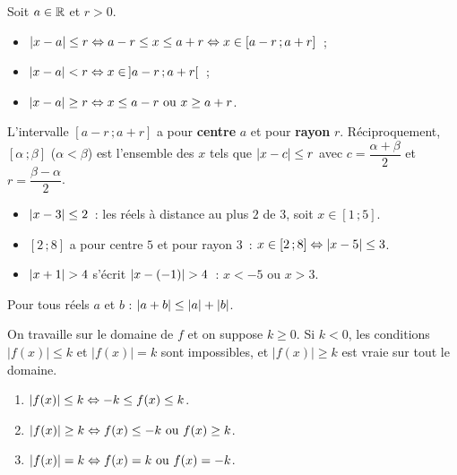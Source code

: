 \begin{prop}
Soit $a\in\mathbb{R}$ et $r>0$.
\begin{itemize}
  \item $\left|x-a\right|\leq r \Leftrightarrow a-r\leq x\leq a+r \Leftrightarrow x\in[a-r\,;a+r]$~;
  \item $\left|x-a\right|< r \Leftrightarrow x\in\,]a-r\,;a+r[$~;
  \item $\left|x-a\right|\geq r \Leftrightarrow x\leq a-r \text{ ou } x\geq a+r$.
\end{itemize}
L'intervalle $[a-r\,;a+r]$ a pour \textbf{centre} $a$ et pour \textbf{rayon} $r$.
R\'eciproquement, $[\alpha\,;\beta]$ ($\alpha<\beta$) est l'ensemble des $x$ tels que
$\left|x-c\right|\leq r$ avec $c=\dfrac{\alpha+\beta}{2}$ et $r=\dfrac{\beta-\alpha}{2}$.
\end{prop}

\begin{ex}
\begin{itemize}
  \item $\left|x-3\right|\leq2$~: les r\'eels \`a distance au plus $2$ de $3$, soit $x\in[1\,;5]$.
  \item $[2\,;8]$ a pour centre $5$ et pour rayon $3$~: $x\in[2\,;8]\Leftrightarrow\left|x-5\right|\leq3$.
  \item $\abs{x+1}>4$ s'\'ecrit $\abs{x-(-1)}>4$~: $x<-5$ ou $x>3$.
\end{itemize}
\end{ex}

\begin{thm}
Pour tous r\'eels $a$ et $b$ : $\left|a + b\right| \leq \left|a\right| + \left|b\right|$.
\end{thm}

\begin{methode}
On travaille sur le domaine de $f$ et on suppose $k\geq0$.
Si $k<0$, les conditions $|f(x)|\leq k$ et $|f(x)|=k$ sont impossibles,
et $|f(x)|\geq k$ est vraie sur tout le domaine.
\begin{enumerate}
  \item $\left|f(x)\right| \leq k \Leftrightarrow -k \leq f(x) \leq k$.
  \item $\left|f(x)\right| \geq k \Leftrightarrow f(x) \leq -k \text{ ou } f(x) \geq k$.
  \item $\left|f(x)\right| = k \Leftrightarrow f(x) = k \text{ ou } f(x) = -k$.
\end{enumerate}
\end{methode}


